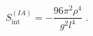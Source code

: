 \begin{equation}
\label{3-6}
S_\mathrm{int}^{(IA)} = - \frac{96\pi^2\rho^4}{g^2 l^4}\;.
\end{equation}

